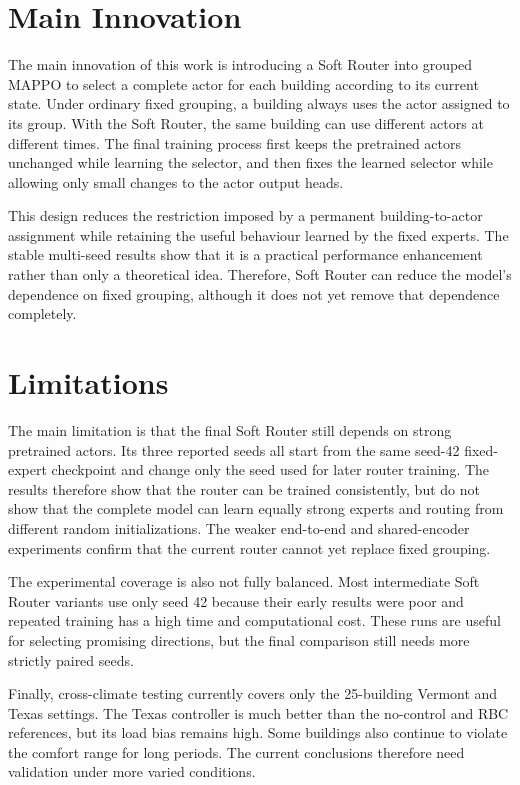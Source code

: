 \section{Main Innovation}

The main innovation of this work is introducing a Soft Router into grouped
MAPPO to select a complete actor for each building according to its current
state. Under ordinary fixed grouping, a building always uses the actor assigned
to its group. With the Soft Router, the same building can use different actors
at different times. The final training process first keeps the pretrained
actors unchanged while learning the selector, and then fixes the learned
selector while allowing only small changes to the actor output heads.

This design reduces the restriction imposed by a permanent building-to-actor
assignment while retaining the useful behaviour learned by the fixed experts.
The stable multi-seed results show that it is a practical performance
enhancement rather than only a theoretical idea. Therefore, Soft Router can
reduce the model's dependence on fixed grouping, although it does not yet remove
that dependence completely.


\section{Limitations}

The main limitation is that the final Soft Router still depends on strong
pretrained actors. Its three reported seeds all start from the same seed-42
fixed-expert checkpoint and change only the seed used for later router training.
The results therefore show that the router can be trained consistently, but do
not show that the complete model can learn equally strong experts and routing
from different random initializations. The weaker end-to-end and shared-encoder
experiments confirm that the current router cannot yet replace fixed grouping.

The experimental coverage is also not fully balanced. Most intermediate Soft
Router variants use only seed 42 because their early results were poor and
repeated training has a high time and computational cost. These runs are useful
for selecting promising directions, but the final comparison still needs more
strictly paired seeds.

Finally, cross-climate testing currently covers only the 25-building Vermont
and Texas settings. The Texas controller is much better than the no-control and
RBC references, but its load bias remains high. Some buildings also continue to
violate the comfort range for long periods. The current conclusions therefore
need validation under more varied conditions.


